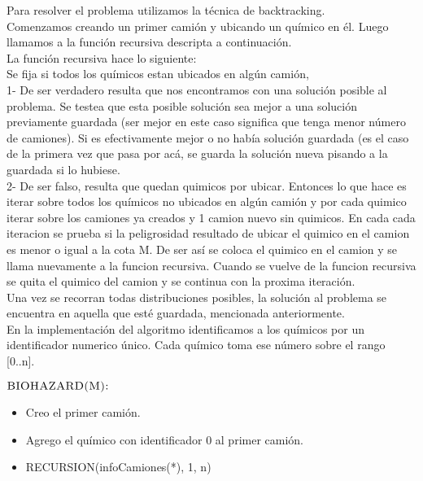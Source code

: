 \noindent
Para resolver el problema utilizamos la t\'ecnica de backtracking. \\
Comenzamos creando un primer cami\'on y ubicando un qu\'imico en \'el. Luego llamamos a la funci\'on recursiva descripta a continuaci\'on. \\
La funci\'on recursiva hace lo siguiente: \\
Se fija si todos los qu\'imicos estan ubicados en alg\'un cami\'on, \\
1- De ser verdadero resulta que nos encontramos con una soluci\'on posible al problema. Se testea que esta posible soluci\'on sea mejor a una soluci\'on previamente guardada (ser mejor en este caso significa que tenga menor n\'umero de camiones). Si es efectivamente mejor o no hab\'ia soluci\'on guardada (es el caso de la primera vez que pasa por ac\'a, se guarda la soluci\'on nueva pisando a la guardada si lo hubiese. \\
2- De ser falso, resulta que quedan quimicos por ubicar. Entonces lo que hace es iterar sobre todos los qu\'imicos no ubicados en alg\'un cami\'on y por cada quimico iterar sobre los camiones ya creados y 1 camion nuevo sin quimicos. En cada cada iteracion se prueba si la peligrosidad resultado de ubicar el quimico en el camion es menor o igual a la cota M. De ser as\'i se coloca el quimico en el camion y se llama nuevamente a la funcion recursiva. Cuando se vuelve de la funcion recursiva se quita el quimico del camion y se continua con la proxima iteraci\'on. \\
Una vez se recorran todas distribuciones posibles, la soluci\'on al problema se encuentra en aquella que est\'e guardada, mencionada anteriormente. \\
\noindent
En la implementaci\'on del algoritmo identificamos a los qu\'imicos por un identificador numerico \'unico. Cada qu\'imico toma ese n\'umero sobre el rango [0..n]. 

\bigskip
\bigskip
\noindent
$\textnormal{\scshape BIOHAZARD(M):}$
\begin{itemize}
	\item Creo el primer cami\'on.
	\item Agrego el qu\'imico con identificador 0 al primer cami\'on.
	\item RECURSION(infoCamiones(*), 1, n)		
\end{itemize} 
\bigskip
\bigskip

